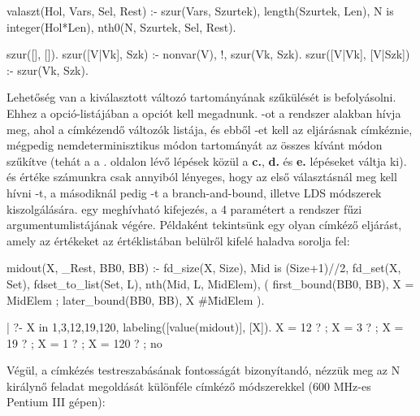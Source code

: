 \begin{prologcode}
valaszt(Hol, Vars, Sel, Rest) :-
        szur(Vars, Szurtek),
        length(Szurtek, Len), N is integer(Hol*Len),
        nth0(N, Szurtek, Sel, Rest).

szur([], []).
szur([V|Vk], Szk) :- nonvar(V), !, szur(Vk, Szk).
szur([V|Vk], [V|Szk]) :- szur(Vk, Szk).
\end{prologcode}

\label{value:enum}
Lehetőség van a kiválasztott változó tartományának szűkülését is befolyásolni. Ehhez a
 opció-listájában a  opciót kell megadnunk. -ot
a rendszer  alakban hívja meg, ahol \cd{[X|Rest]} a címkézendő
változók listája, és ebből -et kell az eljárásnak címkéznie, mégpedig
nemdeterminisztikus módon  tartományát az összes kívánt módon szűkítve (tehát
a  a \pageref{labeling:lepesek}. oldalon lévő lépések közül a
{\bf c.}, {\bf d.} és {\bf e.} lépéseket váltja ki).  és  értéke számunkra
csak annyiból lényeges, hogy az első választásnál meg kell hívni -t,
a másodiknál pedig -t a branch-and-bound, illetve LDS módszerek
kiszolgálására.  egy meghívható kifejezés, a 4 paramétert a rendszer fűzi 
argumentumlistájának végére. Példaként tekintsünk egy olyan címkéző eljárást, amely
az értékeket az értéklistában belülről kifelé haladva sorolja fel:

\begin{prologcode}
midout(X, _Rest, BB0, BB) :-
        fd_size(X, Size),
        Mid is (Size+1)//2,
        fd_set(X, Set),
        fdset_to_list(Set, L),
        nth(Mid, L, MidElem),
        (   first_bound(BB0, BB), X = MidElem
        ;   later_bound(BB0, BB), X #\= MidElem
        ).

| ?- X in {1,3,12,19,120},
     labeling([value(midout)], [X]).
X = 12 ? ;
X = 3 ? ;
X = 19 ? ;
X = 1 ? ;
X = 120 ? ; no
\end{prologcode}

Végül, a címkézés testreszabásának fontosságát bizonyítandó, nézzük meg az N királynő
feladat megoldását különféle címkéző módszerekkel (600 MHz-es Pentium III gépen):

